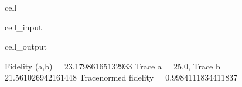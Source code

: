 \documentclass[letterpaper,table,10pt,english]{jupyterBook}
\begin{document}
\begin{sphinxuseclass}{cell}\begin{sphinxVerbatimInput}

\begin{sphinxuseclass}{cell_input}
\begin{sphinxVerbatim}[commandchars=\\\{\}]
\end{sphinxVerbatim}

\end{sphinxuseclass}\end{sphinxVerbatimInput}
\begin{sphinxVerbatimOutput}

\begin{sphinxuseclass}{cell_output}
\begin{sphinxVerbatim}[commandchars=\\\{\}]
Fidelity (a,b) = 23.17986165132933
Trace a = 25.0, Trace b = 21.561026942161448
Trace\PYGZhy{}normed fidelity = 0.9984111834411837
\end{sphinxVerbatim}

\end{sphinxuseclass}\end{sphinxVerbatimOutput}

\end{sphinxuseclass}
\end{document}

